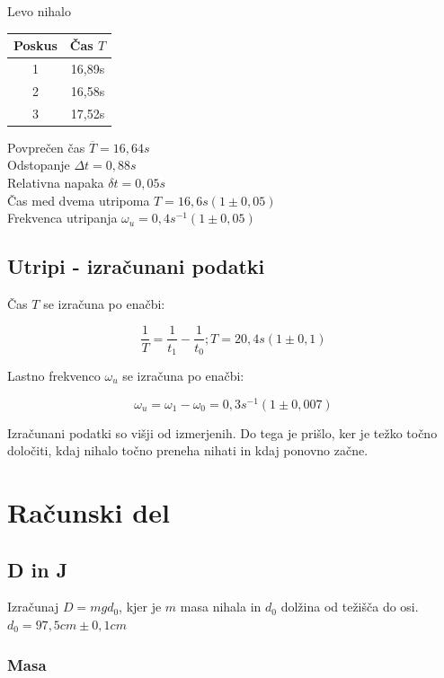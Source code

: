 \documentclass[a4paper]{report}
\begin{document}
\noindent Levo nihalo

\begin{center}
  \begin{tabular}{| c | c |}
    \hline
    Poskus & Čas $T$ \\ \hline
    1 & 16,89s \\ \hline
    2 & 16,58s \\ \hline
    3 & 17,52s \\
    \hline
  \end{tabular}
\end{center}

Povprečen čas $ \overline T = 16,64s$ \\
Odstopanje $\Delta t = 0,88s$ \\
Relativna napaka $\delta t = 0,05s $ \\
Čas med dvema utripoma $T = 16,6s (1 \pm 0,05)$ \\
Frekvenca utripanja $\omega_u = 0,4s^{-1}(1 \pm 0,05)$ \\
 
\section*{Utripi - izračunani podatki}

Čas $T$ se izračuna po enačbi:

\[
  \frac{1}{T} = \frac{1}{t_1} - \frac{1}{t_0}  ;  T = 20,4s (1 \pm 0,1)
\]

Lastno frekvenco $\omega_u$ se izračuna po enačbi:

\[
  \omega_u = \omega_1 - \omega_0 =  0,3s^{-1}(1 \pm 0,007)
\]

\noindent Izračunani podatki so višji od izmerjenih. Do tega je prišlo, ker je težko točno določiti, kdaj nihalo točno preneha nihati in kdaj ponovno začne. 


\chapter*{Računski del}

\section* {D in J}

Izračunaj $D = mgd_0$, kjer je $m$ masa nihala in $d_0$ dolžina od težišča do osi.
$d_0 = 97,5 cm \pm 0,1 cm$

\subsection*{Masa}
\end{document}
